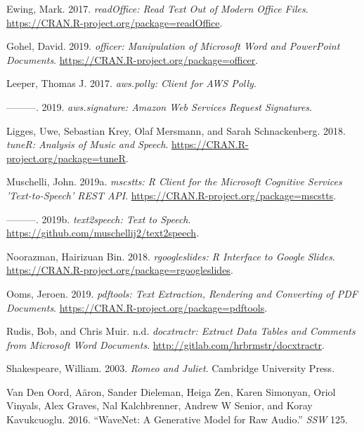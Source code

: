 \leavevmode\hypertarget{ref-readOffice}{}%
Ewing, Mark. 2017. \emph{readOffice: Read Text Out of Modern Office
Files}. \url{https://CRAN.R-project.org/package=readOffice}.

\leavevmode\hypertarget{ref-officer}{}%
Gohel, David. 2019. \emph{officer: Manipulation of Microsoft Word and
PowerPoint Documents}. \url{https://CRAN.R-project.org/package=officer}.

\leavevmode\hypertarget{ref-aws.polly}{}%
Leeper, Thomas J. 2017. \emph{aws.polly: Client for AWS Polly}.

\leavevmode\hypertarget{ref-aws.signature}{}%
---------. 2019. \emph{aws.signature: Amazon Web Services Request
Signatures}.

\leavevmode\hypertarget{ref-tuneR}{}%
Ligges, Uwe, Sebastian Krey, Olaf Mersmann, and Sarah Schnackenberg.
2018. \emph{tuneR: Analysis of Music and Speech}.
\url{https://CRAN.R-project.org/package=tuneR}.

\leavevmode\hypertarget{ref-mscstts}{}%
Muschelli, John. 2019a. \emph{mscstts: R Client for the Microsoft
Cognitive Services 'Text-to-Speech' REST API}.
\url{https://CRAN.R-project.org/package=mscstts}.

\leavevmode\hypertarget{ref-text2speech}{}%
---------. 2019b. \emph{text2speech: Text to Speech}.
\url{https://github.com/muschellij2/text2speech}.

\leavevmode\hypertarget{ref-rgoogleslides}{}%
Noorazman, Hairizuan Bin. 2018. \emph{rgoogleslides: R Interface to
Google Slides}. \url{https://CRAN.R-project.org/package=rgoogleslides}.

\leavevmode\hypertarget{ref-pdftools}{}%
Ooms, Jeroen. 2019. \emph{pdftools: Text Extraction, Rendering and
Converting of PDF Documents}.
\url{https://CRAN.R-project.org/package=pdftools}.

\leavevmode\hypertarget{ref-docxtractr}{}%
Rudis, Bob, and Chris Muir. n.d. \emph{docxtractr: Extract Data Tables
and Comments from Microsoft Word Documents}.
\url{http://gitlab.com/hrbrmstr/docxtractr}.

\leavevmode\hypertarget{ref-shakespeare2003romeo}{}%
Shakespeare, William. 2003. \emph{Romeo and Juliet}. Cambridge
University Press.

\leavevmode\hypertarget{ref-van2016wavenet}{}%
Van Den Oord, Aäron, Sander Dieleman, Heiga Zen, Karen Simonyan, Oriol
Vinyals, Alex Graves, Nal Kalchbrenner, Andrew W Senior, and Koray
Kavukcuoglu. 2016. ``WaveNet: A Generative Model for Raw Audio.''
\emph{SSW} 125.

